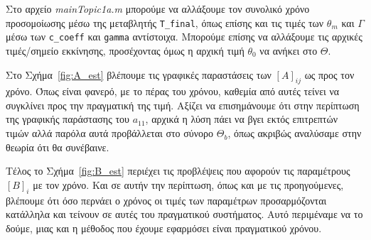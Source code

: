 \documentclass[12pt]{article} %
\numberwithin{equation}{section}  %
\begin{document}
Στο αρχείο \textit{mainTopic1a.m} μπορούμε να αλλάξουμε τον συνολικό χρόνο προσομοίωσης μέσω της μεταβλητής {\small \texttt{T\_final}},
όπως επίσης και τις τιμές των $\theta_m$ και $\Gamma$ μέσω των {\small\texttt{c\_coeff}} και {\small \texttt{gamma}} αντίστοιχα. 
Μπορούμε επίσης να αλλάξουμε τις αρχικές τιμές/σημείο εκκίνησης, προσέχοντας όμως η αρχική τιμή $\theta_0$ να ανήκει στο $\Theta$.

Στο Σχήμα~\ref{fig:A_est} βλέπουμε τις γραφικές παραστάσεις των $[A]_{ij}$ ως προς τον χρόνο. 
Όπως είναι φανερό, με το πέρας του χρόνου, καθεμία από αυτές τείνει να συγκλίνει προς την πραγματική της τιμή.
Αξίζει να επισημάνουμε ότι στην περίπτωση της γραφικής παράστασης του $a_{11}$, αρχικά η λύση πάει να βγει εκτός επιτρεπτών τιμών 
αλλά παρόλα αυτά προβάλλεται στο σύνορο $\Theta_b$, όπως ακριβώς αναλύσαμε στην θεωρία ότι θα συνέβαινε. 

Τέλος το Σχήμα~\ref{fig:B_est} περιέχει τις προβλέψεις που αφορούν τις παραμέτρους $[B]_{i}$ με τον χρόνο. 
Και σε αυτήν την περίπτωση, όπως και με τις προηγούμενες, βλέπουμε ότι όσο περνάει ο χρόνος οι τιμές των παραμέτρων προσαρμόζονται κατάλληλα και τείνουν σε αυτές του πραγματικού συστήματος. 
Αυτό περιμέναμε να το δούμε, μιας και η μέθοδος που έχουμε εφαρμόσει είναι πραγματικού χρόνου.
\end{document}
